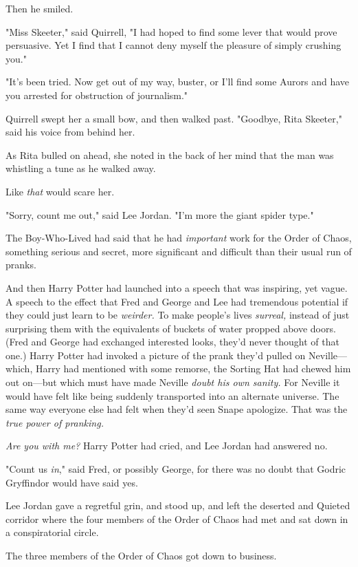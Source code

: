Then he smiled.

"Miss Skeeter," said Quirrell, "I had hoped to find some lever that would prove
persuasive. Yet I find that I cannot deny myself the pleasure of simply
crushing you."

"It's been tried. Now get out of my way, buster, or I'll find some Aurors and
have you arrested for obstruction of journalism."

Quirrell swept her a small bow, and then walked past. "Goodbye, Rita Skeeter,"
said his voice from behind her.

As Rita bulled on ahead, she noted in the back of her mind that the man was
whistling a tune as he walked away.

Like \emph{that} would scare her.

"Sorry, count me out," said Lee Jordan. "I'm more the giant spider type."

The Boy-Who-Lived had said that he had \emph{important} work for the Order of
Chaos, something serious and secret, more significant and difficult than their
usual run of pranks.

And then Harry Potter had launched into a speech that was inspiring, yet vague.
A speech to the effect that Fred and George and Lee had tremendous potential if
they could just learn to be \emph{weirder.} To make people's lives
\emph{surreal,} instead of just surprising them with the equivalents of buckets
of water propped above doors. (Fred and George had exchanged interested looks,
they'd never thought of that one.) Harry Potter had invoked a picture of the
prank they'd pulled on Neville---which, Harry had mentioned with some remorse,
the Sorting Hat had chewed him out on---but which must have made Neville
\emph{doubt his own sanity.} For Neville it would have felt like being suddenly
transported into an alternate universe. The same way everyone else had felt
when they'd seen Snape apologize. That was the \emph{true power of pranking.}

\emph{Are you with me?} Harry Potter had cried, and Lee Jordan had answered no.

"Count us \emph{in}," said Fred, or possibly George, for there was no doubt
that Godric Gryffindor would have said yes.

Lee Jordan gave a regretful grin, and stood up, and left the deserted and
Quieted corridor where the four members of the Order of Chaos had met and sat
down in a conspiratorial circle.

The three members of the Order of Chaos got down to business.

